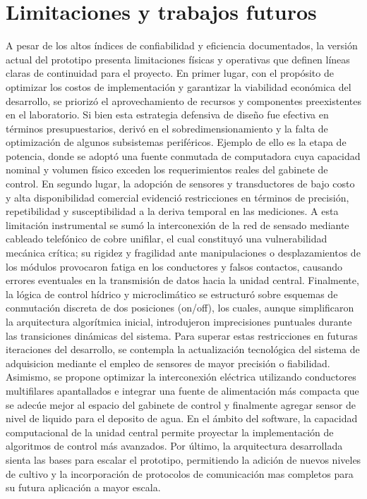 \section*{Limitaciones y trabajos futuros}

A pesar de los altos índices de confiabilidad y eficiencia documentados, la versión actual del prototipo presenta limitaciones físicas y operativas que definen líneas claras de continuidad para el proyecto.  En primer lugar, con el propósito de optimizar los costos de implementación y garantizar la viabilidad económica del desarrollo, se priorizó el aprovechamiento de recursos y componentes preexistentes en el laboratorio. Si bien esta estrategia defensiva de diseño fue efectiva en términos presupuestarios, derivó en el sobredimensionamiento y la falta de optimización de algunos subsistemas periféricos. Ejemplo de ello es la etapa de potencia, donde se adoptó una fuente conmutada de computadora cuya capacidad nominal y volumen físico exceden los requerimientos reales del gabinete de control.  En segundo lugar, la adopción de sensores y transductores de bajo costo y alta disponibilidad comercial evidenció restricciones en términos de precisión, repetibilidad y susceptibilidad a la deriva temporal en las mediciones. A esta limitación instrumental se sumó la interconexión de la red de sensado mediante cableado telefónico de cobre unifilar, el cual constituyó una vulnerabilidad mecánica crítica; su rigidez y fragilidad ante manipulaciones o desplazamientos de los módulos provocaron fatiga en los conductores y falsos contactos, causando errores eventuales en la transmisión de datos hacia la unidad central. Finalmente, la lógica de control hídrico y microclimático se estructuró sobre esquemas de conmutación discreta de dos posiciones (on/off), los cuales, aunque simplificaron la arquitectura algorítmica inicial, introdujeron imprecisiones puntuales durante las transiciones dinámicas del sistema. Para superar estas restricciones en futuras iteraciones del desarrollo, se contempla la actualización tecnológica del sistema de adquisicion mediante el empleo de sensores de mayor precisión o fiabilidad. Asimismo, se propone optimizar la interconexión eléctrica utilizando conductores multifilares apantallados e integrar una fuente de alimentación más compacta que se adecúe mejor al espacio del gabinete de control y finalmente agregar sensor de nivel de liquido para el deposito de agua. En el ámbito del software, la capacidad computacional de la unidad central permite proyectar la implementación de algoritmos de control más avanzados. Por último, la arquitectura desarrollada sienta las bases para escalar el prototipo, permitiendo la adición de nuevos niveles de cultivo y la incorporación de protocolos de comunicación mas completos para su futura aplicación a mayor escala.